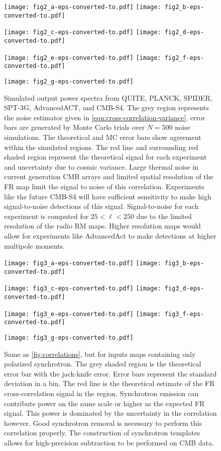 \documentclass[usenatbib,hidelinks]{mnras}
\begin{document}
\begin{figure*}
\centering
\texttt{[image: fig2\_a-eps-converted-to.pdf]}
\texttt{[image: fig2\_b-eps-converted-to.pdf]}

\texttt{[image: fig2\_c-eps-converted-to.pdf]}
\texttt{[image: fig2\_d-eps-converted-to.pdf]}

\texttt{[image: fig2\_e-eps-converted-to.pdf]}
\texttt{[image: fig2\_f-eps-converted-to.pdf]}

\texttt{[image: fig2\_g-eps-converted-to.pdf]}
\caption{Simulated output power spectra from QUITE, PLANCK, SPIDER, SPT-3G, AdvancedACT, and CMB-S4. The grey region represents the noise estimator given in \autoref{eqn:cross-correlation-variance}, error bars are generated by Monte Carlo trials over $N=500$ noise simulations. The theoretical and MC error bars show agreement within the simulated regions. The red line and surrounding red shaded region represent the theoretical signal for each experiment and uncertainty due to cosmic variance. Large thermal noise in current generation CMB arrays and limited spatial resolution of the FR map limit the signal to noise of this correlation. Experiments like the future CMB-S4 will have sufficient sensitivity to make high signal-to-noise detections of this signal. Signal-to-noise for each experiment is computed for $25<\ell<250$ due to the limited resolution of the radio RM maps. Higher resolution maps would allow for experiments like AdvancedAct to make detections at higher multipole moments.
\label{fig:correlations}}
\end{figure*}



\begin{figure*}
\centering
\texttt{[image: fig3\_a-eps-converted-to.pdf]}
\texttt{[image: fig3\_b-eps-converted-to.pdf]}

\texttt{[image: fig3\_c-eps-converted-to.pdf]}
\texttt{[image: fig3\_d-eps-converted-to.pdf]}

\texttt{[image: fig3\_e-eps-converted-to.pdf]}
\texttt{[image: fig3\_f-eps-converted-to.pdf]}

\texttt{[image: fig3\_g-eps-converted-to.pdf]}
\caption{Same as \autoref{fig:correlations}, but for inputs maps containing only polarized synchrotron. The grey shaded region is the theoretical error bar with the jack-knife error. Error bars represent the standard deviation in a bin. The red line is the theoretical estimate of the FR cross-correlation signal in the region. Synchrotron emission can contribute power on the same scale or higher as the expected FR signal. This power is dominated by the uncertainty in the correlation however. Good synchrotron removal is necessary to perform this correlation properly. The construction of synchrotron templates allows for high-precision subtraction to be performed on CMB data.
\label{fig:frxfore_sync}}
\end{figure*}
\end{document}
